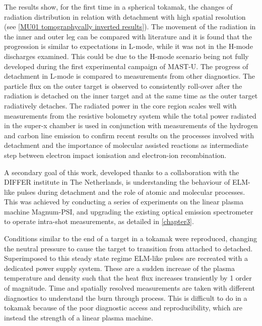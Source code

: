 The results show, for the first time in a spherical tokamak, the changes of radiation distribution in relation with detachment with high spatial resolution (see \autoref{MU01 tomographycally inverted results}). The movement of the radiation in the inner and outer leg can be compared with literature\cite{Reimold2015,Potzel2014,Lipschultz1984,Bernert2021} and it is found that the progression is similar to expectations in L-mode, while it was not in the H-mode discharges examined. This could be due to the H-mode scenario being not fully developed during the first experimental campaign of MAST-U. The progress of detachment in L-mode is compared to measurements from other diagnostics. The particle flux on the outer target is observed to consistently roll-over after the radiation is detached on the inner target and at the same time as the outer target radiatively detaches.
The radiated power in the core region scales well with measurements from the resistive bolometry system while the total power radiated in the super-x chamber is used in conjunction with measurements of the hydrogen and carbon line emission to confirm recent results on the processes involved with detachment\cite{Verhaegh2022} and the importance of molecular assisted reactions as intermediate step between electron impact ionisation and electron-ion recombination.

A secondary goal of this work, developed thanks to a collaboration with the DIFFER institute in The Netherlands, is understanding the behaviour of ELM-like pulses during detachment and the role of atomic and molecular processes. This was achieved by conducting a series of experiments on the linear plasma machine Magnum-PSI, and upgrading the existing optical emission spectrometer to operate intra-shot measurements, as detailed in \autoref{chapter3}.

Conditions similar to the end of a target in a tokamak were reproduced, changing the neutral pressure to cause the target to transition from attached to detached. Superimposed to this steady state regime ELM-like pulses are recreated with a dedicated power supply system. These are a sudden increase of the plasma temperature and density such that the heat flux increases transiently by 1 order of magnitude. Time and spatially resolved measurements are taken with different diagnostics to understand the burn through process. This is difficult to do in a tokamak because of the poor diagnostic access and reproducibility, which are instead the strength of a linear plasma machine.

